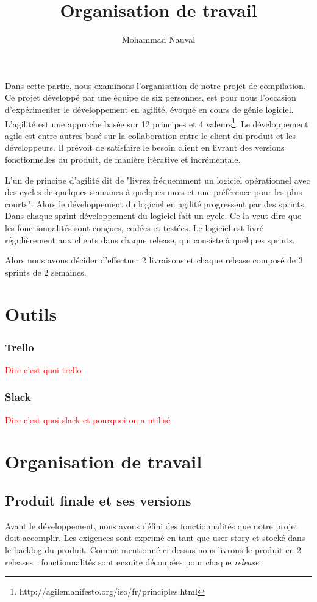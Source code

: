 \documentclass[a4paper,12pt]{article}
\title{Organisation de travail}
\author{Mohammad Nauval}
\begin{document}
\maketitle

Dans cette partie, nous examinons l'organisation de notre projet de compilation. Ce projet développé par une équipe de six personnes, est pour nous l'occasion d'expérimenter le développement en agilité, évoqué en cours de génie logiciel. L'agilité est une approche basée sur 12 principes et 4 valeurs\footnote{http://agilemanifesto.org/iso/fr/principles.html}. Le développement agile est entre autres basé sur la collaboration entre le client du produit et les développeurs. Il prévoit de satisfaire le besoin client en livrant des versions fonctionnelles du produit, de manière itérative et incrémentale. 

L'un de principe d'agilité dit de "livrez fréquemment un logiciel opérationnel avec des
cycles de quelques semaines à quelques mois et une préférence pour les plus courts". Alors le développement du logiciel en agilité progressent par des sprints. Dans chaque sprint développement du logiciel fait un cycle. Ce la veut dire que les fonctionnalités sont conçues, codées et testées. Le logiciel est livré régulièrement aux clients dans chaque release, qui consiste à quelques sprints. 

Alors nous avons décider d'effectuer 2 livraisons et chaque release composé de 3 sprints de 2 semaines.   

\section{Outils}
\subsubsection{Trello}
\textcolor{red}{Dire c'est quoi trello}

\subsubsection{Slack}
\textcolor{red}{Dire c'est quoi slack et pourquoi on a utilisé}

\section{Organisation de travail}
\subsection{Produit finale et ses versions}
Avant le développement, nous avons défini des fonctionnalités que notre projet doit accomplir. Les exigences sont exprimé en tant que user story et stocké dans le backlog du produit.
Comme mentionné ci-dessus nous livrons le produit en 2 releases : fonctionnalités sont ensuite découpées pour chaque \textit{release}.
\end{document}
